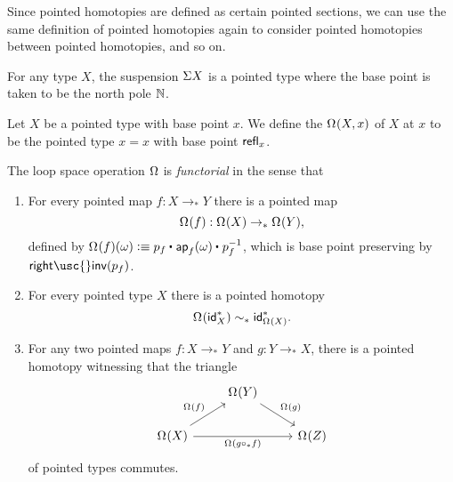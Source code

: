 \begin{rmk}
  Since pointed homotopies are defined as certain pointed sections, we can use the same definition of pointed homotopies again to consider pointed homotopies between pointed homotopies, and so on.
\end{rmk}

\begin{comment}
\begin{rmk}
  Note that the type of pointed sections $\Pi^\ast_{(x:X)}P(x)$ is the fiber of the evaluation function at $\ast_X$. Thus, we have a pullback square
  \begin{equation*}
    \begin{tikzcd}
      \Pi^\ast_{(x:X)}P(x) \arrow[r] \arrow[d] & \unit \arrow[d,"\ast_P"] \\
      \prd{x:X}P(x) \arrow[r,swap,"\mathsf{ev}_{\ast_X}"] & P(\ast_X).
    \end{tikzcd}
  \end{equation*}
\end{rmk}
\end{comment}

\begin{eg}
  For any type $X$, the suspension $\Sigma{X}$ is a pointed type where the base point is taken to be the north pole ${\mathbb{N}}$.
\end{eg}

\begin{defn}
Let $X$ be a pointed type with base point $x$. We define the  $\Omega^{}(X,x)$ of $X$ at $x$ to be the pointed type $x=x$ with base point $\mathsf{refl}_{x}$. 
\end{defn}

\begin{defn}
The loop space operation $\Omega$ is \emph{functorial} in the sense that
\begin{enumerate}
\item For every pointed map $f:X\to_\ast Y$ there is a pointed map
\begin{equation*}
\Omega^{}(f):\Omega^{}(X)\to_\ast \Omega^{}(Y),
\end{equation*}
defined by $\loopspace{f}(\omega)\defeq \ct{p_f}{\ap{f}{\omega}}{p_f^{-1}}$, which is base point preserving by $\mathsf{right\usc{}inv}(p_f)$. 
\item For every pointed type $X$ there is a pointed homotopy
\begin{equation*}
\Omega^{}(\mathsf{id}_X^\ast)\sim_\ast \mathsf{id}^\ast_{\Omega^{}(X)}.
\end{equation*}
\item For any two pointed maps $f:X\to_\ast Y$ and $g:Y\to_\ast X$, there is a pointed homotopy witnessing that the triangle
\begin{equation*}
\begin{tikzcd}
& \loopspace{Y} \arrow[dr,"\loopspace{g}"] \\
\loopspace{X} \arrow[rr,swap,"\loopspace{g\circ_\ast f}"] \arrow[ur,"\loopspace{f}"] & & \loopspace{Z}
\end{tikzcd}
\end{equation*}
of pointed types commutes.
\end{enumerate}
\end{defn}

